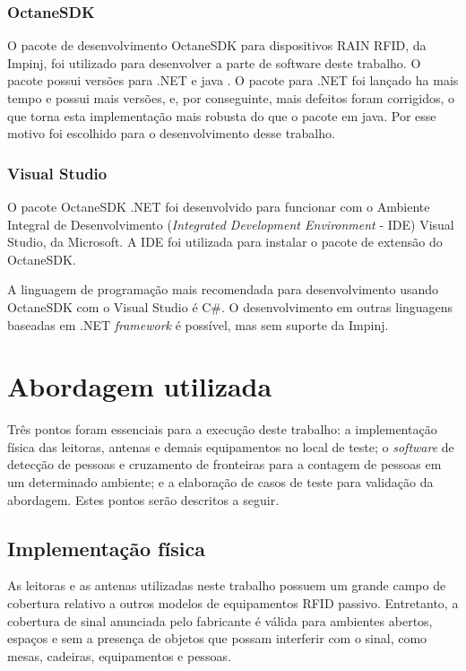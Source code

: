  \subsubsection{OctaneSDK}
 
 O pacote de desenvolvimento OctaneSDK para dispositivos RAIN RFID, da Impinj, foi utilizado para desenvolver a parte de software deste trabalho. O pacote possui versões para .NET e java \cite{OctaneSDK}. O pacote para .NET foi lançado ha mais tempo e possui mais versões, e, por conseguinte, mais defeitos foram corrigidos, o que torna esta implementação mais robusta do que o pacote em java. Por esse motivo foi escolhido para o desenvolvimento desse trabalho.
 
 \subsubsection{Visual Studio}
 
 O pacote OctaneSDK .NET foi desenvolvido para funcionar com o Ambiente Integral de Desenvolvimento (\textit{Integrated Development Environment} - IDE) Visual Studio, da Microsoft. A IDE foi utilizada para instalar o pacote de extensão do OctaneSDK. \cite{OctaneSDK}
 
 A linguagem de programação mais recomendada para desenvolvimento usando OctaneSDK com o Visual Studio é C\#. O desenvolvimento em outras linguagens baseadas em .NET \textit{framework} é possível, mas sem suporte da Impinj.

 
 \section{Abordagem utilizada}
 
 Três pontos foram essenciais para a execução deste trabalho: a implementação física das leitoras, antenas e demais equipamentos no local de teste; o \textit{software} de detecção de pessoas e cruzamento de fronteiras para a contagem de pessoas em um determinado ambiente;  e a elaboração de casos de teste para  validação da abordagem. Estes pontos serão descritos a seguir.
 
  
 \subsection{Implementação física}
 
 As leitoras e as antenas utilizadas neste trabalho possuem um grande campo de cobertura relativo a outros modelos de equipamentos RFID passivo. Entretanto, a cobertura de sinal anunciada pelo fabricante é válida para ambientes abertos, espaços e sem a presença de objetos que possam interferir com o sinal, como mesas, cadeiras, equipamentos e pessoas.
 
